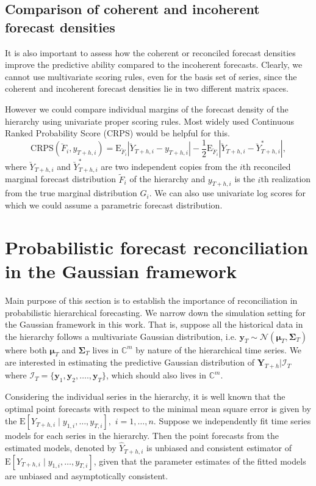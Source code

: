 \documentclass[a4paper, 11pt]{article}
\def\E{\text{E}}
\begin{document}
	\subsection{Comparison of coherent and incoherent forecast densities}
	
	It is also important to assess how the coherent or reconciled forecast densities improve the predictive ability compared to the incoherent forecasts. Clearly, we cannot use multivariate scoring rules, even for the basis set of series, since the coherent and incoherent forecast densities lie in two different matrix spaces.
	
	However we could compare individual margins of the forecast density of the hierarchy using univariate proper scoring rules. Most widely used Continuous Ranked Probability Score (CRPS) would be helpful for this.
	\begin{equation} \label{eq:(3.6)}
	\text{CRPS}(\breve{F}_i,y_{T+h,i}) = \E_{\breve{F}_i}|\breve{Y}_{T+h,i}-y_{T+h,i}| - \frac{1}{2}\E_{\breve{F}_i}|\breve{Y}_{T+h,i}-\breve{Y}^*_{T+h,i}|,
	\end{equation}
	where $\breve{Y}_{T+h,i}$ and $\breve{Y}^*_{T+h,i}$ are two independent copies from the $i$th reconciled marginal forecast distribution $\tilde{F}_i$ of the hierarchy and $y_{T+h,i}$ is the $i$th realization from the true marginal distribution $G_i$. We can also use univariate log scores for which we could assume a parametric forecast distribution.
	
	\section{Probabilistic forecast reconciliation in the Gaussian framework}\label{sec:gaussian}
	
	Main purpose of this section is to establish the importance of reconciliation in probabilistic hierarchical forecasting. We narrow down the simulation setting for the Gaussian framework in this work. That is, suppose all the historical data in the hierarchy follows a multivariate Gaussian distribution, i.e. $\bm{y}_T \sim \mathscr{N}(\bm{\mu}_T, \bm{\Sigma}_T)$ where both $\bm{\mu}_T$ and $\bm{\Sigma}_T$ lives in $\mathbb{C}^m$ by nature of the hierarchical time series. We are interested in estimating the predictive Gaussian distribution of $\bm{Y}_{T+h}| \bm{\mathcal{I}}_T$ where $\bm{\mathcal{I}}_T= \{\bm{y}_1,\bm{y}_2,\dots.,\bm{y}_T\}$, which should also lives in $\mathbb{C}^m$.
	
	Considering the individual series in the hierarchy, it is well known that the optimal point forecasts with respect to the minimal mean square error is given by the $\E[Y_{T+h,i}\mid y_{1,i},\dots,y_{T,i}],$ $i=1,\dots,n$. Suppose we independently fit time series models for each series in the hierarchy. Then the point forecasts from the estimated models, denoted by $\hat{Y}_{T+h,i}$ is unbiased and consistent estimator of $\E[Y_{T+h,i}\mid y_{1,i},\dots,y_{T,i}]$, given that the parameter estimates of the fitted models are unbiased and asymptotically consistent.
	
\end{document}
